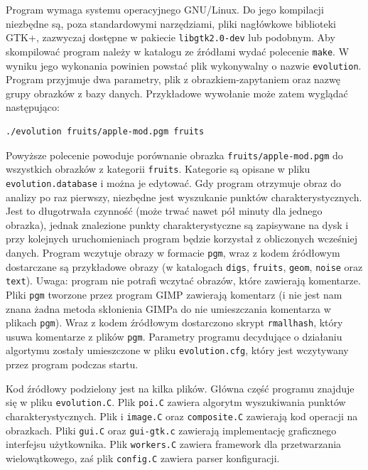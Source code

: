\documentclass[a4paper,12pt,leqno]{article}
\begin{document}
Program wymaga systemu operacyjnego GNU/Linux. Do jego kompilacji niezbędne są, poza standardowymi narzędziami, pliki nagłówkowe biblioteki GTK+,
zazwyczaj dostępne w pakiecie \texttt{libgtk2.0-dev} lub podobnym. Aby skompilować program należy w katalogu ze źródłami wydać polecenie \texttt{make}.
W wyniku jego wykonania powinien powstać plik wykonywalny o nazwie \texttt{evolution}. Program przyjmuje dwa parametry, plik z obrazkiem-zapytaniem oraz
nazwę grupy obrazków z bazy danych. Przykładowe wywołanie może zatem wyglądać następująco:
\begin{verbatim}./evolution fruits/apple-mod.pgm fruits\end{verbatim}
Powyższe polecenie powoduje porównanie obrazka \texttt{fruits/apple-mod.pgm} do wszystkich obrazków z kategorii \texttt{fruits}.
Kategorie są opisane w pliku \texttt{evolution.database} i można je edytować. Gdy program otrzymuje obraz do analizy po raz pierwszy, niezbędne jest
wyszukanie punktów charakterystycznych. Jest to długotrwała czynność (może trwać nawet pół minuty dla jednego obrazka), jednak znalezione punkty
charakterystyczne są zapisywane na dysk i przy kolejnych uruchomieniach program będzie korzystał z obliczonych wcześniej danych. Program wczytuje
obrazy w formacie \texttt{pgm}, wraz z kodem źródłowym dostarczane są przykładowe obrazy (w katalogach \texttt{digs}, \texttt{fruits}, \texttt{geom},
\texttt{noise} oraz \texttt{text}). Uwaga: program nie potrafi wczytać obrazów, które zawierają komentarze. Pliki \texttt{pgm} tworzone przez program
GIMP zawierają komentarz (i nie jest nam znana żadna metoda skłonienia GIMPa do nie umieszczania komentarza w plikach \texttt{pgm}). Wraz z kodem
źródłowym dostarczono skrypt \texttt{rmallhash}, który usuwa komentarze z plików \texttt{pgm}. Parametry programu decydujące o działaniu algortymu
zostały umieszczone w pliku \texttt{evolution.cfg}, który jest wczytywany przez program podczas startu.

Kod źródłowy podzielony jest na kilka plików. Główna część programu znajduje się w pliku \texttt{evolution.C}. Plik \texttt{poi.C} zawiera algorytm
wyszukiwania punktów charakterystycznych. Plik i \texttt{image.C} oraz \texttt{composite.C} zawierają kod operacji na obrazkach. Pliki \texttt{gui.C}
oraz \texttt{gui-gtk.c} zawierają implementację graficznego interfejsu użytkownika. Plik \texttt{workers.C} zawiera framework dla przetwarzania
wielowątkowego, zaś plik \texttt{config.C} zawiera parser konfiguracji.
\end{document}
